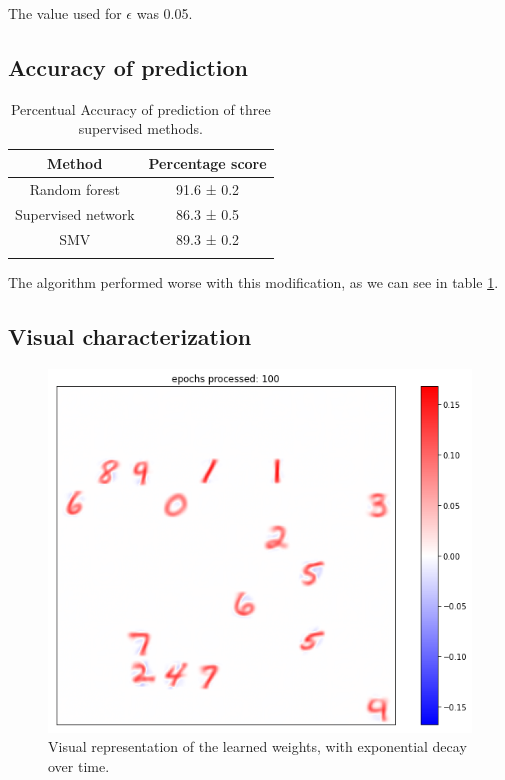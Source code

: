 \documentclass[a4paper]{report}
\begin{document}
The value used for $\epsilon$ was 0.05.

\subsection{Accuracy of prediction}

\begin{table}[h!]
  \begin{center}
    \caption{Percentual Accuracy of prediction of three supervised methods.}
    \begin{tabular}{c|c} %
      \textbf{Method} & \textbf{Percentage score}\\
      \hline
      Random forest & 91.6  ± 0.2\\
      Supervised network & 86.3 ± 0.5\\
      SMV & 89.3 ± 0.2\\
        \label{decayT}
    \end{tabular}
  \end{center}
\end{table}

The algorithm performed worse with this modification, as we can see in table \ref{decayT}.

\subsection{Visual characterization}

\begin{figure} [H]
\centering
\includegraphics [width=12cm ] {h/cento.png}
\caption{Visual representation of the learned weights, with exponential decay over time.}
\end{figure}
\end{document}
